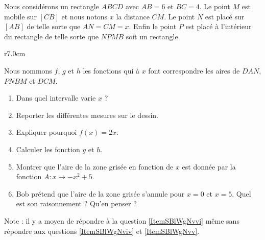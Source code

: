 
\begin{exercice}[\ldots/6]\label{exosmath-0633}

    Nous considérons un rectangle \( ABCD\) avec \( AB=6\) et \( BC=4\). Le point \( M\) est mobile sur \( [CB]\) et nous notons \( x\) la distance \( CM\). Le point \( N\) est placé sur \( [AB]\) de telle sorte que \( AN=CM=x\). Enfin le point \( P\) est placé à l'intérieur du rectangle de telle sorte que \( NPMB\) soit un rectangle

\begin{wrapfigure}{r}{7.0cm}
   \vspace{-0.5cm}        %
   \centering
   
\end{wrapfigure}

    Nous nommons \( f\), \( g\) et \( h\) les fonctions qui à \( x\) font correspondre les aires de \( DAN\), \( PNBM\) et \( DCM\).

    \begin{enumerate}
        \item
            Dans quel intervalle varie \( x\) ?
        \item
            Reporter les différentes mesures sur le dessin.
        \item
            Expliquer pourquoi \( f(x)=2x\).
        \item   \label{ItemSBlWgNviv}
            Calculer les fonction \( g\) et \( h\).
        \item\label{ItemSBlWgNvv}
            Montrer que l'aire de la zone grisée en fonction de \( x\) est donnée par la fonction \( A\colon x\mapsto -x^2+5\).
        \item\label{ItemSBlWgNvvi}
            Bob prétend que l'aire de la zone grisée s'annule pour \( x=0\) et \( x=5\). Quel est son raisonnement ? Qu'en penser ?
    \end{enumerate}
    Note : il y a moyen de répondre à la question \ref{ItemSBlWgNvvi} même sans répondre aux questions \ref{ItemSBlWgNviv} et \ref{ItemSBlWgNvv}.

\end{exercice}
